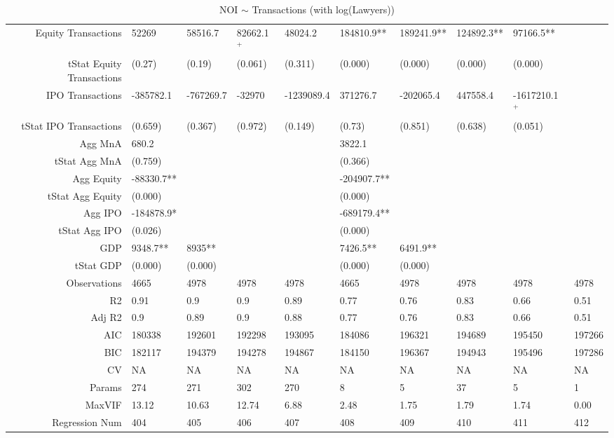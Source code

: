 \begin{table}[ht]
\begin{tabular}{rlllllllll}
  Equity Transactions & 52269 & 58516.7 & 82662.1$^{+}$ & 48024.2 & 184810.9** & 189241.9** & 124892.3** & 97166.5** &  \\ 
  tStat Equity Transactions & (0.27) & (0.19) & (0.061) & (0.311) & (0.000) & (0.000) & (0.000) & (0.000) &  \\ 
  IPO Transactions & -385782.1 & -767269.7 & -32970 & -1239089.4 & 371276.7 & -202065.4 & 447558.4 & -1617210.1$^{+}$ &  \\ 
  tStat IPO Transactions & (0.659) & (0.367) & (0.972) & (0.149) & (0.73) & (0.851) & (0.638) & (0.051) &  \\ 
  Agg MnA & 680.2 &  &  &  & 3822.1 &  &  &  &  \\ 
  tStat Agg MnA & (0.759) &  &  &  & (0.366) &  &  &  &  \\ 
  Agg Equity & -88330.7** &  &  &  & -204907.7** &  &  &  &  \\ 
  tStat Agg Equity & (0.000) &  &  &  & (0.000) &  &  &  &  \\ 
  Agg IPO & -184878.9* &  &  &  & -689179.4** &  &  &  &  \\ 
  tStat Agg IPO & (0.026) &  &  &  & (0.000) &  &  &  &  \\ 
  GDP & 9348.7** & 8935** &  &  & 7426.5** & 6491.9** &  &  &  \\ 
  tStat GDP & (0.000) & (0.000) &  &  & (0.000) & (0.000) &  &  &  \\ 
  Observations & 4665 & 4978 & 4978 & 4978 & 4665 & 4978 & 4978 & 4978 & 4978 \\ 
  R2 & 0.91 & 0.9 & 0.9 & 0.89 & 0.77 & 0.76 & 0.83 & 0.66 & 0.51 \\ 
  Adj R2 & 0.9 & 0.89 & 0.9 & 0.88 & 0.77 & 0.76 & 0.83 & 0.66 & 0.51 \\ 
  AIC & 180338 & 192601 & 192298 & 193095 & 184086 & 196321 & 194689 & 195450 & 197266 \\ 
  BIC & 182117 & 194379 & 194278 & 194867 & 184150 & 196367 & 194943 & 195496 & 197286 \\ 
  CV & NA & NA & NA & NA & NA & NA & NA & NA & NA \\ 
  Params & 274 & 271 & 302 & 270 & 8 & 5 & 37 & 5 & 1 \\ 
  MaxVIF & 13.12 & 10.63 & 12.74 & 6.88 & 2.48 & 1.75 & 1.79 & 1.74 & 0.00 \\ 
  Regression Num & 404 & 405 & 406 & 407 & 408 & 409 & 410 & 411 & 412 \\ 
   \hline
\end{tabular}
\caption{NOI $\sim$ Transactions (with log(Lawyers))} 
\end{table}
